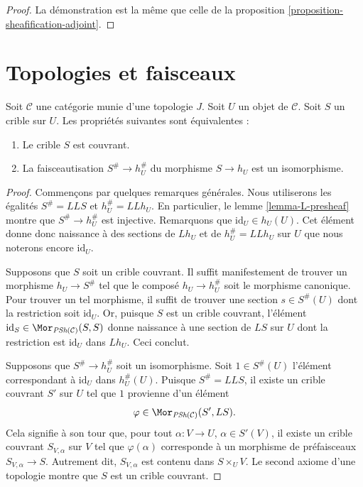 \begin{proof}
La démonstration est la même que celle de la proposition \ref{proposition-sheafification-adjoint}.
\end{proof}














\section{Topologies et faisceaux}
\label{section-topology-and-sheaves}

\begin{lemma}
\label{lemma-sieve-sheafification}
Soit $\mathcal{C}$ une catégorie munie d'une topologie $J$.
Soit $U$ un objet de $\mathcal{C}$.
Soit $S$ un crible sur $U$. Les propriétés suivantes sont équivalentes :
\begin{enumerate}
\item Le crible $S$ est couvrant.
\item La faisceautisation $S^\# \to h_U^\#$
du morphisme $S \to h_U$ est un isomorphisme.
\end{enumerate}
\end{lemma}

\begin{proof}
Commençons par quelques remarques générales.
Nous utiliserons les égalités $S^\# = LLS$ et $h_U^\# = LLh_U$.
En particulier, le lemme \ref{lemma-L-presheaf} montre que
$S^\# \to h_U^\#$ est injective. Remarquons que
$\text{id}_U \in h_U(U)$. Cet élément donne donc naissance à
des sections de $Lh_U$ et de $h_U^\# = LLh_U$ sur $U$ que
nous noterons encore $\text{id}_U$.

\medskip\noindent
Supposons que $S$ soit un crible couvrant. Il suffit manifestement de
trouver un morphisme $h_U \to S^\#$ tel que le composé
$h_U \to h_U^\#$ soit le morphisme canonique. Pour trouver un tel morphisme,
il suffit de trouver une section $s \in S^\#(U)$ dont la restriction
soit $\text{id}_U$. Or, puisque $S$ est un
crible couvrant, l'élément
$\text{id}_S \in \Mor_{\textit{PSh}(\mathcal{C})}(S, S)$
donne naissance à une section de $LS$ sur $U$ dont la restriction
est $\text{id}_U$ dans $Lh_U$. Ceci conclut.

\medskip\noindent
Supposons que $S^\# \to h_U^\#$ soit un isomorphisme.
Soit $1 \in S^\#(U)$ l'élément correspondant à
$\text{id}_U$ dans $h_U^\#(U)$. Puisque $S^\# = LLS$,
il existe un crible couvrant $S'$ sur $U$ tel que
$1$ provienne d'un élément
$$
\varphi \in \Mor_{\textit{PSh}(\mathcal{C})}(S', LS).
$$
Cela signifie à son tour que, pour tout $\alpha : V \to U$,
$\alpha\in S'(V)$, il existe un crible couvrant $S_{V, \alpha}$
sur $V$ tel que $\varphi(\alpha)$ corresponde à
un morphisme de préfaisceaux $S_{V, \alpha} \to S$. Autrement dit,
$S_{V, \alpha}$ est contenu dans $S \times_U V$. Le second
axiome d'une topologie montre que $S$ est un crible couvrant.
\end{proof}

